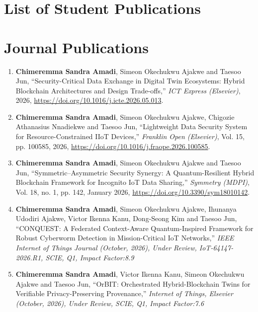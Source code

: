 \begin{titlepage}
\section*{\Huge List of Student Publications}

\vspace{0.5cm}
\large

\section*{\Large Journal Publications}
\begin{enumerate}
\item \textbf{Chimeremma Sandra Amadi}, Simeon Okechukwu Ajakwe and Taesoo Jun, ``Security-Critical Data Exchange in Digital Twin Ecosystems: Hybrid Blockchain Architectures and Design Trade-offs,'' \textit{ICT Express (Elsevier)}, 2026, \url{https://doi.org/10.1016/j.icte.2026.05.013}.

\item \textbf{Chimeremma Sandra Amadi}, Simeon Okechukwu Ajakwe, Chigozie Athanasius Nnadiekwe and Taesoo Jun, ``Lightweight Data Security System for Resource-Constrained IIoT Devices,'' \textit{Franklin Open (Elsevier)}, Vol. 15, pp. 100585, 2026, \url{https://doi.org/10.1016/j.fraope.2026.100585}.

\item \textbf{Chimeremma Sandra Amadi}, Simeon Okechukwu Ajakwe and Taesoo Jun, ``Symmetric--Asymmetric Security Synergy: A Quantum-Resilient Hybrid Blockchain Framework for Incognito IoT Data Sharing,'' \textit{Symmetry (MDPI)}, Vol. 18, no. 1, pp. 142, January 2026, \url{https://doi.org/10.3390/sym18010142}.

\item \textbf{Chimeremma Sandra Amadi}, Simeon Okechukwu Ajakwe, Ihunanya Udodiri Ajakwe, Victor Ikenna Kanu, Dong-Seong Kim and Taesoo Jun, ``CONQUEST: A Federated Context-Aware Quantum-Inspired Framework for Robust Cyberworm Detection in Mission-Critical IoT Networks,'' \textit{IEEE Internet of Things Journal (October, 2026), Under Review, IoT-64147-2026.R1, SCIE, Q1, Impact Factor:8.9}

\item \textbf{Chimeremma Sandra Amadi}, Victor Ikenna Kanu, Simeon Okechukwu Ajakwe and Taesoo Jun, ``OrBIT: Orchestrated Hybrid-Blockchain Twins for Verifiable Privacy-Preserving Provenance,'' \textit{Internet of Things, Elsevier (October, 2026), Under Review, SCIE, Q1, Impact Factor:7.6}


\end{enumerate}
\end{titlepage}
